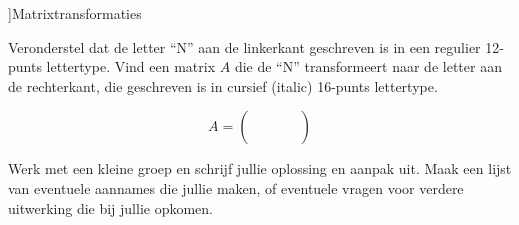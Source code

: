 \documentclass{ximera}
\begin{document}
\author{Alexander Holvoet}
\xmtitle]{Matrixtransformaties}{}


\begin{problem}
Veronderstel dat de letter ``N'' aan de linkerkant geschreven is in een regulier 12-punts lettertype. Vind een matrix $A$ die de ``N'' transformeert naar de letter aan de rechterkant, die geschreven is in cursief (italic) 16-punts lettertype.

\begin{center}
\end{center}

$$A = \begin{pmatrix} \phantom{00} & \phantom{00} \\ \phantom{00} & \phantom{00} \end{pmatrix}$$

Werk met een kleine groep en schrijf jullie oplossing en aanpak uit. Maak een lijst van eventuele aannames die jullie maken, of eventuele vragen voor verdere uitwerking die bij jullie opkomen.
\end{problem}
\end{document}
